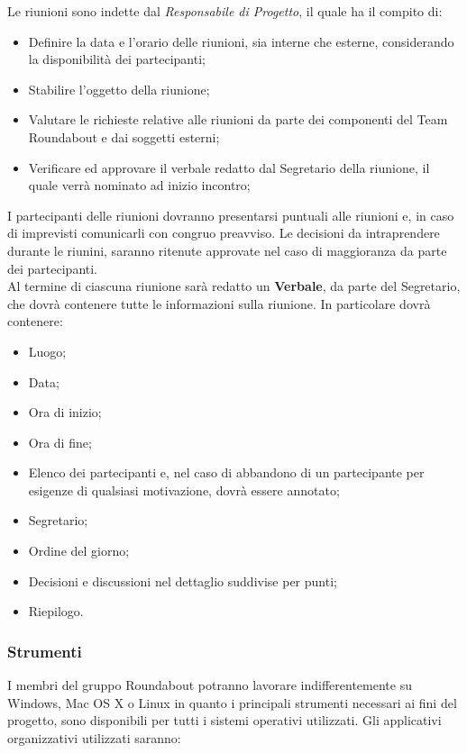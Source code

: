				Le riunioni sono indette dal \textit{Responsabile di Progetto}, il quale ha il compito di:
				\begin{itemize}
					\item Definire la data e l'orario delle riunioni, sia interne che esterne, considerando la disponibilità dei partecipanti;
					\item Stabilire l'oggetto della riunione;
					\item Valutare le richieste relative alle riunioni da parte dei componenti del Team Roundabout e dai soggetti esterni;
					\item Verificare ed approvare il verbale redatto dal Segretario della riunione, il quale verrà nominato ad inizio incontro;
				\end{itemize}
				I partecipanti delle riunioni dovranno presentarsi puntuali alle riunioni e, in caso di imprevisti comunicarli con congruo preavviso.
				Le decisioni da intraprendere durante le riunini, saranno ritenute approvate nel caso di maggioranza da parte dei partecipanti.\\
				Al termine di ciascuna riunione sarà redatto un \textbf{Verbale}, da parte del Segretario, che dovrà contenere tutte le informazioni sulla riunione. In particolare dovrà contenere:
				\begin{itemize}
					\item Luogo;
					\item Data;
					\item Ora di inizio;
					\item Ora di fine;
					\item Elenco dei partecipanti e, nel caso di abbandono di un partecipante per esigenze di qualsiasi motivazione, dovrà essere annotato;
					\item Segretario;
					\item Ordine del giorno;
					\item Decisioni e discussioni nel dettaglio suddivise per punti;
					\item Riepilogo.
				\end{itemize}
		
		
		\subsubsection{Strumenti}
			I membri del gruppo Roundabout potranno lavorare indifferentemente su Windows, Mac OS X o Linux in quanto i principali strumenti necessari ai fini del progetto, sono disponibili per tutti i sistemi operativi utilizzati. Gli applicativi organizzativi utilizzati saranno:
			
